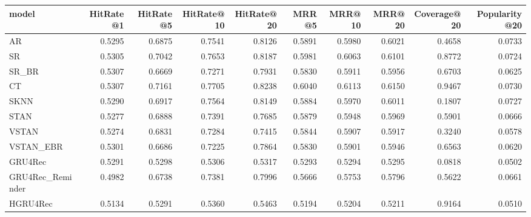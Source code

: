 \begin{tabular}{lrrrrrrrrr}
\toprule
            model &  HitRate@1 &  HitRate@5 &  HitRate@10 &  HitRate@20 &   MRR@5 &  MRR@10 &  MRR@20 &  Coverage@20 &  Popularity@20 \\
\midrule
               AR &     0.5295 &     0.6875 &      0.7541 &      0.8126 &  0.5891 &  0.5980 &  0.6021 &       0.4658 &         0.0733 \\
               SR &     0.5305 &     0.7042 &      0.7653 &      0.8187 &  0.5981 &  0.6063 &  0.6101 &       0.8772 &         0.0724 \\
            SR\_BR &     0.5307 &     0.6669 &      0.7271 &      0.7931 &  0.5830 &  0.5911 &  0.5956 &       0.6703 &         0.0625 \\
               CT &     0.5307 &     0.7161 &      0.7705 &      0.8238 &  0.6040 &  0.6113 &  0.6150 &       0.9467 &         0.0730 \\
             SKNN &     0.5290 &     0.6917 &      0.7564 &      0.8149 &  0.5884 &  0.5970 &  0.6011 &       0.1807 &         0.0727 \\
             STAN &     0.5277 &     0.6888 &      0.7391 &      0.7685 &  0.5879 &  0.5948 &  0.5969 &       0.5901 &         0.0666 \\
            VSTAN &     0.5274 &     0.6831 &      0.7284 &      0.7415 &  0.5844 &  0.5907 &  0.5917 &       0.3240 &         0.0578 \\
        VSTAN\_EBR &     0.5301 &     0.6686 &      0.7225 &      0.7864 &  0.5830 &  0.5901 &  0.5946 &       0.6563 &         0.0620 \\
          GRU4Rec &     0.5291 &     0.5298 &      0.5306 &      0.5317 &  0.5293 &  0.5294 &  0.5295 &       0.0818 &         0.0502 \\
 GRU4Rec\_Reminder &     0.4982 &     0.6738 &      0.7381 &      0.7996 &  0.5666 &  0.5753 &  0.5796 &       0.5622 &         0.0661 \\
         HGRU4Rec &     0.5134 &     0.5291 &      0.5360 &      0.5463 &  0.5194 &  0.5204 &  0.5211 &       0.9164 &         0.0510 \\
\bottomrule
\end{tabular}

